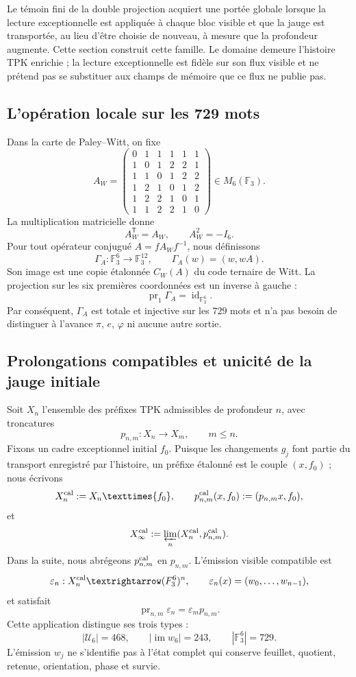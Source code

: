 Le témoin fini de la double projection acquiert une portée globale lorsque la
lecture exceptionnelle est appliquée à chaque bloc visible et que la jauge est
transportée, au lieu d'être choisie de nouveau, à mesure que la profondeur augmente. Cette
section construit cette famille. Le domaine demeure l'histoire TPK
enrichie ; la lecture exceptionnelle est fidèle sur son flux visible et ne
prétend pas se substituer aux champs de mémoire que ce flux ne publie pas.

\subsection{L'opération locale sur les 729 mots}

Dans la carte de Paley--Witt, on fixe
\[
A_W=
\begin{pmatrix}
0&1&1&1&1&1\\
1&0&1&2&2&1\\
1&1&0&1&2&2\\
1&2&1&0&1&2\\
1&2&2&1&0&1\\
1&1&2&2&1&0
\end{pmatrix}
\in M_6(\mathbb F_3).
\]
La multiplication matricielle donne
\[
A_W^{\mathsf T}=A_W,\qquad A_W^2=-I_6.
\]
Pour tout opérateur conjugué \(A=fA_Wf^{-1}\), nous définissons
\[
\Gamma_A:\mathbb F_3^6\longrightarrow\mathbb F_3^{12},
\qquad
\Gamma_A(w)=(w,wA).
\]
Son image est une copie étalonnée \(C_W(A)\) du code ternaire de Witt.
La projection sur les six premières coordonnées est un inverse à gauche :
\[
\operatorname{pr}_1\Gamma_A=\operatorname{id}_{\mathbb F_3^6}.
\]
Par conséquent, \(\Gamma_A\) est totale et injective sur les \(729\) mots et
n'a pas besoin de distinguer à l'avance \(\pi\), \(e\), \(\varphi\) ni aucune
autre sortie.

\subsection{Prolongations compatibles et unicité de la jauge initiale}

Soit \(X_n\) l'ensemble des préfixes TPK admissibles de profondeur \(n\), avec
troncatures
\[
p_{n,m}:X_n\longrightarrow X_m,\qquad m\leq n.
\]
Fixons un cadre exceptionnel initial \(f_0\). Puisque les changements \(g_j\) font
partie du transport enregistré par l'histoire, un préfixe étalonné est le
couple \((x,f_0)\) ; nous écrivons
\[
 X_n^{\rm cal}:=X_n\times\{f_0\},\qquad
 p_{n,m}^{\rm cal}(x,f_0):=(p_{n,m}x,f_0),
\]
et
\[
 X_\infty^{\rm cal}
 :=\varprojlim_n(X_n^{\rm cal},p_{n,m}^{\rm cal}).
\]
Dans la suite, nous abrégeons \(p_{n,m}^{\rm cal}\) en \(p_{n,m}\).
L'émission visible compatible est
\[
\varepsilon_n:X_n^{\rm cal}\longrightarrow(\mathbb F_3^6)^n,
\qquad
\varepsilon_n(x)=(w_0,\ldots,w_{n-1}),
\]
et satisfait
\[
\operatorname{pr}_{n,m}\varepsilon_n
=\varepsilon_m p_{n,m}.
\]
Cette application distingue ses trois types :
\[
|\mathcal U_6|=468,\qquad
|\operatorname{im}w_6|=243,\qquad
|\mathbb F_3^6|=729.
\]
L'émission \(w_j\) ne s'identifie pas à l'état complet qui conserve
feuillet, quotient, retenue, orientation, phase et survie.

